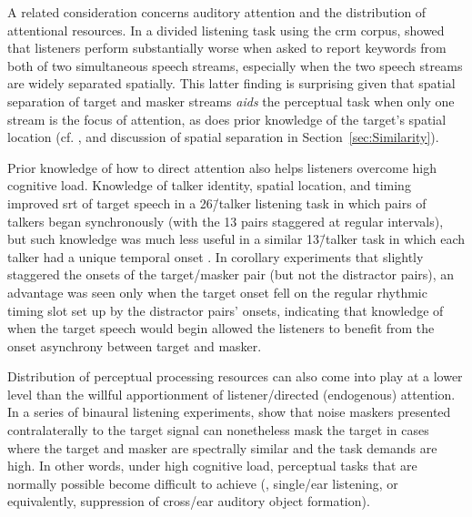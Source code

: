 A related consideration concerns auditory attention and the distribution of attentional resources.  In a divided listening task using the \ac{crm} corpus, \citet{BestEtAl2006} showed that listeners perform substantially worse when asked to report keywords from both of two simultaneous speech streams, especially when the two speech streams are widely separated spatially.  This latter finding is surprising given that spatial separation of target and masker streams {\em aids} the perceptual task when only one stream is the focus of attention, as does prior knowledge of the target’s spatial location (cf. \citealt{KiddEtAl2005a}, and discussion of spatial separation in Section~\ref{sec:Similarity}).  

Prior knowledge of how to direct attention also helps listeners overcome high cognitive load.  Knowledge of talker identity, spatial location, and timing improved \ac{srt} of target speech in a 26\=/talker listening task in which pairs of talkers began synchronously (with the 13 pairs staggered at regular intervals), but such knowledge was much less useful in a similar 13\=/talker task in which each talker had a unique temporal onset \citep{KitterickEtAl2010}.  In corollary experiments that slightly staggered the onsets of the target\-/masker pair (but not the distractor pairs), an advantage was seen only when the target onset fell on the regular rhythmic timing slot set up by the distractor pairs’ onsets, indicating that knowledge of when the target speech would begin allowed the listeners to benefit from the onset asynchrony between target and masker.

Distribution of perceptual processing resources can also come into play at a lower level than the willful apportionment of listener\-/directed (endogenous) attention.  In a series of binaural listening experiments, \citet{GallunEtAl2007} show that noise maskers presented contralaterally to the target signal can nonetheless mask the target in cases where the target and masker are spectrally similar and the task demands are high.  In other words, under high cognitive load, perceptual tasks that are normally possible become difficult to achieve (\eg, single\-/ear listening, or equivalently, suppression of cross\-/ear auditory object formation).  %

